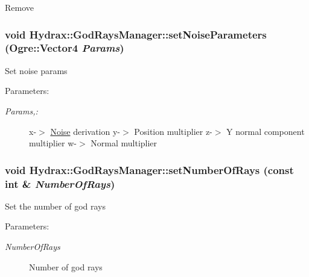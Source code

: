 \begin{CompactItemize}
Remove \hypertarget{class_hydrax_1_1_god_rays_manager_7ca2848326fa661d5a62a830b108be38}{
\subsubsection[{setNoiseParameters}]{\setlength{\rightskip}{0pt plus 5cm}void Hydrax::GodRaysManager::setNoiseParameters (Ogre::Vector4 {\em Params})}}
\label{class_hydrax_1_1_god_rays_manager_7ca2848326fa661d5a62a830b108be38}


Set noise params \begin{Desc}
\item[Parameters:]
\begin{description}
\item[{\em Params,:}]x-$>$ \hyperlink{namespace_hydrax_1_1_noise}{Noise} derivation y-$>$ Position multiplier z-$>$ Y normal component multiplier w-$>$ Normal multiplier \end{description}
\end{Desc}
\hypertarget{class_hydrax_1_1_god_rays_manager_ed0d897dae3ae6c585a616d071f02c71}{
\subsubsection[{setNumberOfRays}]{\setlength{\rightskip}{0pt plus 5cm}void Hydrax::GodRaysManager::setNumberOfRays (const int \& {\em NumberOfRays})}}
\label{class_hydrax_1_1_god_rays_manager_ed0d897dae3ae6c585a616d071f02c71}


Set the number of god rays \begin{Desc}
\item[Parameters:]
\begin{description}
\item[{\em NumberOfRays}]Number of god rays \end{description}
\end{Desc}
\hypertarget{class_hydrax_1_1_god_rays_manager_4a85152f7e71a50c473ae65b299f3465}{
}
\end{CompactItemize}
